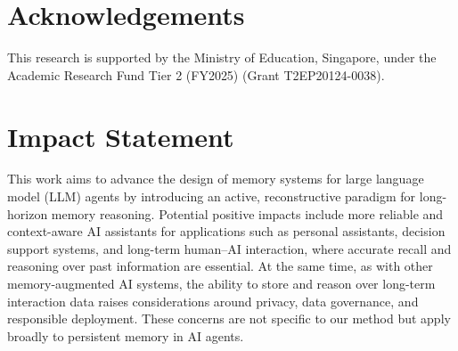 \documentclass{article}
\theoremstyle{plain}
\theoremstyle{definition}
\theoremstyle{remark}
\begin{document}



\section*{Acknowledgements}

This research is supported by the Ministry of Education, Singapore, under the Academic Research Fund Tier 2 (FY2025) (Grant T2EP20124-0038).

\section*{Impact Statement}

This work aims to advance the design of memory systems for large language model (LLM) agents by introducing an active, reconstructive paradigm for long-horizon memory reasoning.
Potential positive impacts include more reliable and context-aware AI assistants for applications such as personal assistants, decision support systems, and long-term human–AI interaction, where accurate recall and reasoning over past information are essential.
At the same time, as with other memory-augmented AI systems, the ability to store and reason over long-term interaction data raises considerations around privacy, data governance, and responsible deployment. These concerns are not specific to our method but apply broadly to persistent memory in AI agents.


\nocite{langley00}




\end{document}
